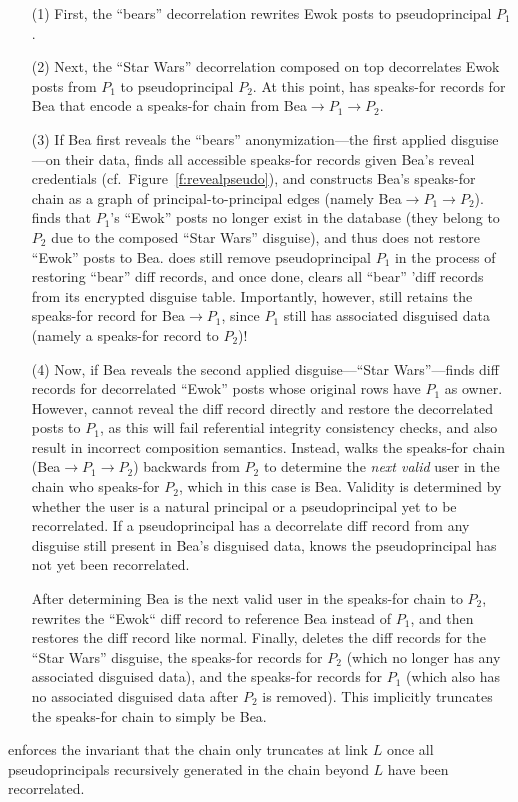 %
\begin{enumerate}
    \item[(1)] First, the ``bears''
decorrelation rewrites Ewok posts to pseudoprincipal $P_1$.
%
\item[(2)] Next, the ``Star
Wars'' decorrelation composed on top decorrelates Ewok posts from $P_1$ to
pseudoprincipal $P_2$.  At this point, \sys has speaks-for records for Bea that
encode a speaks-for chain from Bea$ \to P_1 \to P_2$.
%
\item[(3)] If Bea first reveals the ``bears'' anonymization---the first applied
disguise---on their data, \sys finds all accessible speaks-for records given
Bea's reveal credentials (cf.\ Figure~\ref{f:revealpseudo}), and constructs Bea's
speaks-for chain as a graph of principal-to-principal edges (namely Bea$\to
P_1\to P_2$).
%
\sys finds that $P_1$'s ``Ewok'' posts no longer exist in the database (they belong to
$P_2$ due to the composed ``Star Wars'' disguise), and thus does not restore 
``Ewok'' posts to Bea. \sys does still remove pseudoprincipal $P_1$ in the process
of restoring ``bear'' diff records, and once done, clears all ``bear'' 'diff
records from its encrypted disguise table. 
%
Importantly, however, \sys still retains the speaks-for record for Bea$\to P_1$,
since $P_1$ still has associated disguised data (namely a speaks-for record to $P_2$)!
%
\item[(4)] Now, if Bea reveals the second applied disguise---``Star Wars''---\sys finds
diff records for decorrelated ``Ewok'' posts whose original rows have $P_1$ as
owner. 
%
However, \sys cannot reveal the diff record directly and restore the
decorrelated posts to $P_1$, as this will fail referential integrity consistency
checks, and also result in incorrect composition semantics. Instead, \sys walks
the speaks-for chain (Bea$\to P_1 \to P_2$) backwards from $P_2$ to determine
the \emph{next valid} user in the chain who speaks-for $P_2$, which in this case
is Bea.
%
Validity is determined by whether the user is a natural principal or a
pseudoprincipal yet to be recorrelated. If a pseudoprincipal has a decorrelate
diff record from any disguise still present in Bea's disguised data, \sys knows
the pseudoprincipal has not yet been recorrelated.
%

%
After determining Bea is the next valid user in the speaks-for chain to $P_2$,
\sys rewrites the ``Ewok`` diff record to reference Bea instead of $P_1$,
and then restores the diff record like normal.
%
Finally, \sys deletes the diff records for the ``Star Wars'' disguise, the
speaks-for records for $P_2$ (which no longer has any associated disguised
data), and the speaks-for records for $P_1$ (which also has no associated
disguised data after $P_2$ is removed).
%
This implicitly truncates the speaks-for chain to simply be Bea.
\end{enumerate}
%
\sys enforces the invariant that the chain only truncates at link
$L$ once all pseudoprincipals recursively generated in the chain beyond $L$ have
been recorrelated.
%

